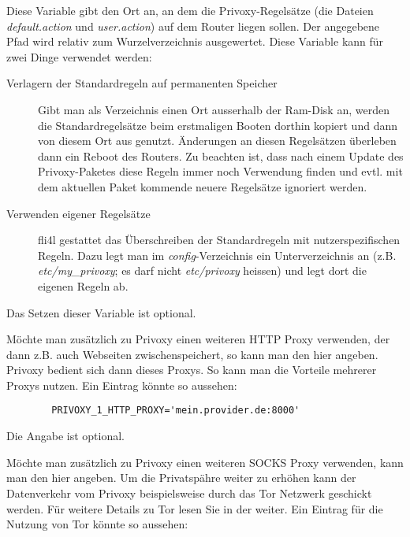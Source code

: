 \begin{description}
 {
  Diese Variable gibt den Ort an, an dem die Privoxy-Regelsätze (die Dateien
\emph{default.action} und \emph{user.action}) auf dem Router liegen sollen. Der
angegebene Pfad wird relativ zum Wurzelverzeichnis ausgewertet.
  Diese Variable kann für zwei Dinge verwendet werden:
  \begin{description}
  \item [Verlagern der Standardregeln auf permanenten Speicher]
    Gibt man als Verzeichnis einen Ort ausserhalb der Ram-Disk an, werden die
Standardregelsätze beim erstmaligen Booten dorthin kopiert und dann von diesem
Ort aus genutzt. Änderungen an diesen Regelsätzen überleben dann ein Reboot des
Routers. Zu beachten ist, dass nach einem Update des Privoxy-Paketes diese
Regeln immer noch Verwendung finden und evtl. mit dem aktuellen Paket kommende
neuere Regelsätze ignoriert werden.
  \item [Verwenden eigener Regelsätze]
    fli4l gestattet das Überschreiben der Standardregeln mit nutzerspezifischen
Regeln. Dazu legt man im \emph{config}-Verzeichnis ein Unterverzeichnis an (z.B.
\emph{etc/my\_privoxy}; es darf nicht \emph{etc/privoxy} heissen) und legt dort
die eigenen Regeln ab.
\end{description}
  Das Setzen dieser Variable ist optional.
}


        {Möchte man zusätzlich zu Privoxy einen weiteren HTTP Proxy
        verwenden, der dann z.B. auch Webseiten zwischenspeichert, so
        kann man den hier angeben. Privoxy bedient sich dann dieses
        Proxys. So kann man die Vorteile mehrerer Proxys nutzen. Ein
        Eintrag könnte so aussehen:

\begin{example}
\begin{verbatim}
        PRIVOXY_1_HTTP_PROXY='mein.provider.de:8000'
\end{verbatim}
\end{example}
        Die Angabe ist optional.}


        {Möchte man zusätzlich zu Privoxy einen weiteren SOCKS Proxy
        verwenden, kann man den hier angeben.
        Um die Privatspähre weiter zu erhöhen kann der Datenverkehr
        vom Privoxy beispielsweise durch das Tor Netzwerk geschickt werden.
        Für weitere Details zu Tor lesen Sie in der
         weiter.
        Ein Eintrag für die Nutzung von Tor könnte so aussehen:

}
\end{description}
